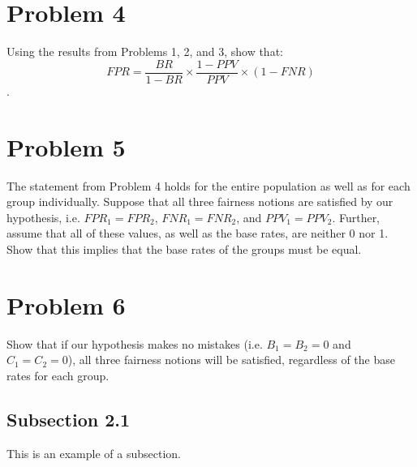 \documentclass[11pt]{article}
\begin{document}
\section{Problem 4}
Using the results from Problems 1, 2, and 3, show that:
\[FPR = \frac{BR}{1-BR}\times\frac{1-PPV}{PPV}\times(1 -FNR)\]
.

\section{Problem 5}
The statement from Problem 4 holds for the entire population as well as for each group individually. Suppose that all three fairness notions are satisfied by our hypothesis, i.e. $FPR_1 = FPR_2$, $FNR_1 = FNR_2$, and $PPV_1 = PPV_2$. Further, assume that all of these values, as well as the base rates, are neither 0 nor 1. Show that this implies that the base rates of the groups must be equal.

\section{Problem 6}
Show that if our hypothesis makes no mistakes (i.e. $B_1 = B_2 = 0$ and $C_1 = C_2 = 0$), all three fairness notions will be satisfied, regardless of the base rates for each group.

\subsection{Subsection 2.1} 
This is an example of a subsection.
\end{document}
